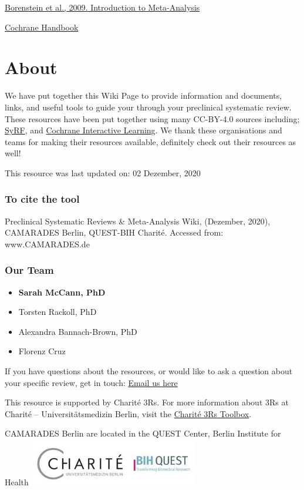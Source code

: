 \documentclass[
]{book}
\providecommand{\tightlist}{%
  \setlength{\itemsep}{0pt}\setlength{\parskip}{0pt}}
\begin{document}
\href{https://doi.org/10.1002/9780470743386}{Borenstein et al., 2009. Introduction to Meta-Analysis}

\href{https://handbook-5-1.cochrane.org/}{Cochrane Handbook}

\hypertarget{about}{%
\chapter{About}\label{about}}

We have put together this Wiki Page to provide information and documents, links, and useful tools to guide your through your preclinical systematic review. These resources have been put together using many CC-BY-4.0 sources including; \href{http://syrf.org.uk/}{SyRF}, and \href{https://training.cochrane.org/interactivelearning}{Cochrane Interactive Learning}. We thank these organisations and teams for making their resources available, definitely check out their resources as well!

This resource was last updated on: 02 Dezember, 2020

\hypertarget{to-cite-the-tool}{%
\subsection{To cite the tool}\label{to-cite-the-tool}}

Preclinical Systematic Reviews \& Meta-Analysis Wiki, (Dezember, 2020), CAMARADES Berlin, QUEST-BIH Charité. Accessed from: www.CAMARADES.de

\hypertarget{our-team}{%
\subsection{Our Team}\label{our-team}}

\begin{itemize}
\tightlist
\item
  \textbf{Sarah McCann, PhD}
\item
  Torsten Rackoll, PhD
\item
  Alexandra Bannach-Brown, PhD
\item
  Florenz Cruz
\end{itemize}

If you have questions about the resources, or would like to ask a question about your specific review, get in touch: \href{mailto:CAMARADES.berlin@charite.de}{Email us here}

This resource is supported by Charité 3Rs. For more information about 3Rs at Charité -- Universitätsmedizin Berlin, visit the \href{https://charite3r.charite.de/en/charite_3r_toolbox/}{Charité 3Rs Toolbox}.

CAMARADES Berlin are located in the QUEST Center, Berlin Institute for Health
\includegraphics[width=0.55\textwidth,height=\textheight]{charite-BIHquest.jpg}

  
\end{document}
